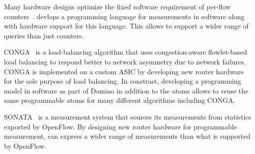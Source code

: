  Many hardware designs optimize the fixed
software requirement of per-flow counters~\cite{sundar_counters, lrt}.
\TheSystem devlops a programming language for measurements in software along
with hardware support for this language. This allows \TheSystem to support a
wider range of queries than just counters.

 CONGA~\cite{conga} is a load-balancing algorithm that uses
congestion-aware flowlet-based load balancing to respond better to network
asymmetry due to network failures. CONGA is implemented on a custom ASIC by
developing new router hardware for the sole purpose of load balancing. In
constrast, developing a programming model in software as part of Domino in
addition to the atoms allows to reuse the same programmable atoms for many
different algorithms including CONGA.

 SONATA~\cite{sonata} is a measurement system that sources its
measurements from statistics exported by OpenFlow. By designing new router
hardware for programmable measurement, \TheSystem can express a wider range of
measurements than what is supported by OpenFlow.
